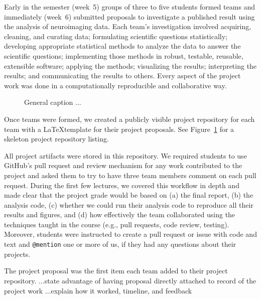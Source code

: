 Early in the semester (week~5) groups of three to five students formed teams
and immediately (week~6) submitted proposals to investigate
a published result using the analysis of neuroimaging data.
Each team's investigation involved
acquiring, cleaning, and curating data;
formulating scientific questions statistically;
developing appropriate statistical methods
to analyze the data to answer the scientific questions;
implementing those methods in robust, testable, reusable, extensible software;
applying the methods;
visualizing the results;
interpreting the results;
and communicating the results to others.
Every aspect of the project work was done in a computationally reproducible
and collaborative way.

\begin{figure}
\centering

\caption{General caption ...}
\label{fig:repo}
\end{figure}

Once teams were formed, we created a publicly visible project repository for
each team with a \LaTeX template for their project proposals.
See Figure~\ref{fig:repo} for a skeleton project repository listing.

All project artifacts were stored in this repository.
We required students to use GitHub's pull request and review mechanism
for any work contributed to the project and asked them to try to have
three team members comment on each pull request.
During the first few lectures, we covered this workflow in depth
and made clear that the project grade would be based on
(a) the final report,
(b) the analysis code,
(c) whether we could run their analysis code to reproduce all
their results and figures, and
(d) how effectively the team collaborated using the techniques
taught in the course (e.g., pull requests, code review, testing).
Moreover, students were instructed to create a pull request
or issue with code and text and \texttt{@mention} one or more of us,
if they had any questions about their projects.

The project proposal was the first item each team added to their project repository.
...state advantage of having proposal directly attached to record of the
project work
...explain how it worked, timeline, and feedback

